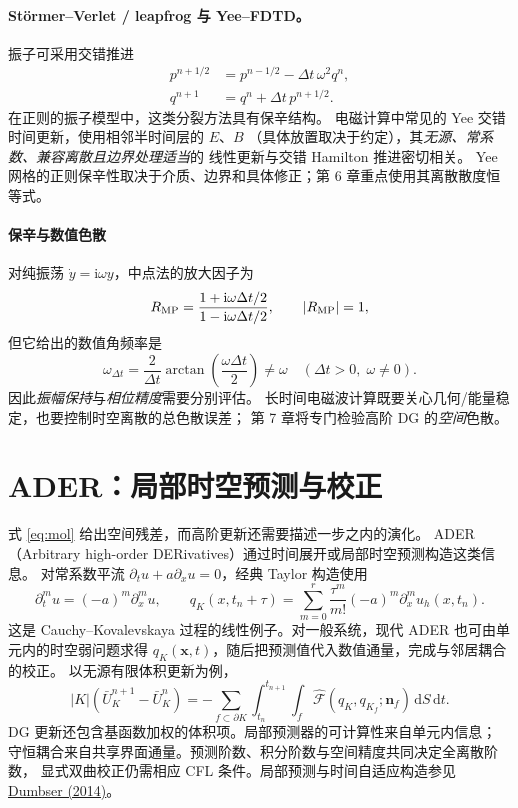 \documentclass[UTF8,11pt,openany]{ctexbook}
\numberwithin{equation}{chapter}
\theoremstyle{definition}
\theoremstyle{remark}
\newcommand{\dd}{\mathrm d}
\begin{document}
\paragraph{St\"ormer--Verlet / leapfrog 与 Yee--FDTD。}
振子可采用交错推进
\begin{align}\label{eq:leapfrogosc}
p^{n+1/2}&=p^{n-1/2}-\Delta t\,\omega^2q^n,\\
q^{n+1}&=q^n+\Delta t\,p^{n+1/2}.
\end{align}
在正则的振子模型中，这类分裂方法具有保辛结构。
电磁计算中常见的 Yee 交错时间更新，使用相邻半时间层的 $E$、$B$
（具体放置取决于约定），其\emph{无源、常系数、兼容离散且边界处理适当}的
线性更新与交错 Hamilton 推进密切相关。
Yee 网格的正则保辛性取决于介质、边界和具体修正；第 6 章重点使用其离散散度恒等式。

\paragraph{保辛与数值色散}
对纯振荡 $\dot y=\mathrm i\omega y$，中点法的放大因子为
\begin{equation}
R_{\rm MP}=\frac{1+\mathrm i\omega\Delta t/2}{1-\mathrm i\omega\Delta t/2},
\qquad |R_{\rm MP}|=1,
\end{equation}
但它给出的数值角频率是
\begin{equation}\label{eq:midpointdisp}
\omega_{\Delta t}=\frac2{\Delta t}
\arctan\!\left(\frac{\omega\Delta t}{2}\right)
\ne\omega\quad(\Delta t>0,\;\omega\ne0).
\end{equation}
因此\emph{振幅保持}与\emph{相位精度}需要分别评估。
长时间电磁波计算既要关心几何/能量稳定，也要控制时空离散的总色散误差；
第 7 章将专门检验高阶 DG 的\emph{空间}色散。

\section{ADER：局部时空预测与校正}\label{sec:ader}
式 \eqref{eq:mol} 给出空间残差，而高阶更新还需要描述一步之内的演化。
ADER（Arbitrary high-order DERivatives）通过时间展开或局部时空预测构造这类信息。
对常系数平流 $\partial_tu+a\partial_xu=0$，经典 Taylor 构造使用
\begin{equation}\label{eq:ader-taylor}
\partial_t^m u=(-a)^m\partial_x^m u,\qquad
q_K(x,t_n+\tau)=\sum_{m=0}^{r}
\frac{\tau^m}{m!}(-a)^m\partial_x^m u_h(x,t_n).
\end{equation}
这是 Cauchy--Kovalevskaya 过程的线性例子。对一般系统，现代 ADER 也可由单元内的时空弱问题求得
$q_K(\bm x,t)$，随后把预测值代入数值通量，完成与邻居耦合的校正。
以无源有限体积更新为例，
\begin{equation}\label{eq:ader-corrector}
|K|(\bar U_K^{n+1}-\bar U_K^n)
=-\sum_{f\subset\partial K}\int_{t_n}^{t_{n+1}}\int_f
\widehat{\mathcal F}(q_K,q_{K_f};\bm n_f)\,\dd S\,\dd t.
\end{equation}
DG 更新还包含基函数加权的体积项。局部预测器的可计算性来自单元内信息；
守恒耦合来自共享界面通量。预测阶数、积分阶数与空间精度共同决定全离散阶数，
显式双曲校正仍需相应 CFL 条件。局部预测与时间自适应构造参见
\href{https://doi.org/10.1016/j.cma.2014.07.019}{Dumbser (2014)}。
\end{document}
